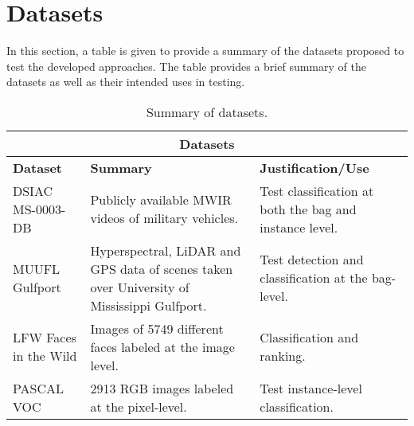 \section{Datasets}
In this section, a table is given to provide a summary of the datasets proposed to test the developed approaches.  The table provides a brief summary of the datasets as well as their intended uses in testing.

\begin{longtable}{ |p{4cm}|p{6cm}|p{4cm}|  } 
	\caption{Summary of datasets.}
	\label{tab:Datasets}\\
	\hline
	\multicolumn{3}{|c|}{\textbf{Datasets}} \\
	\hline
	\textbf{Dataset} & \textbf{Summary} & \textbf{Justification/Use}\\
	\hline
	DSIAC MS-0003-DB   &  Publicly available MWIR videos of military vehicles. & Test classification at both the bag and instance level.   \\
	\hline
	MUUFL Gulfport &  Hyperspectral, LiDAR and GPS data of scenes taken over University of Mississippi Gulfport. & Test detection and classification at the bag-level.   \\
	\hline
	LFW Faces in the Wild & Images of 5749 different faces labeled at the  image level. & Classification and ranking. \\
	\hline
	PASCAL VOC  & 2913 RGB images labeled at the pixel-level. & Test instance-level classification. \\
	\hline
\end{longtable}